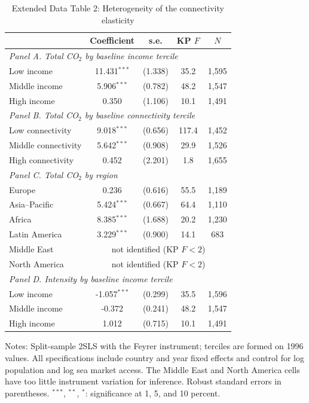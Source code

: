 \documentclass[12pt]{article}
\begin{document}
\begin{table}[htbp]
\centering
\begin{threeparttable}
\caption{Extended Data Table 2: Heterogeneity of the connectivity elasticity}
\label{tab:hetero}
\footnotesize
\begin{tabular}{lcccc}
\toprule
 & Coefficient & s.e. & KP $F$ & $N$ \\
\midrule
\multicolumn{5}{l}{\textit{Panel A. Total CO$_2$ by baseline income tercile}} \\
  Low income & 11.431$^{***}$ & (1.338) & 35.2 & 1,595 \\
  Middle income & 5.906$^{***}$ & (0.782) & 48.2 & 1,547 \\
  High income & 0.350 & (1.106) & 10.1 & 1,491 \\
\midrule
\multicolumn{5}{l}{\textit{Panel B. Total CO$_2$ by baseline connectivity tercile}} \\
  Low connectivity & 9.018$^{***}$ & (0.656) & 117.4 & 1,452 \\
  Middle connectivity & 5.642$^{***}$ & (0.908) & 29.9 & 1,526 \\
  High connectivity & 0.452 & (2.201) & 1.8 & 1,655 \\
\midrule
\multicolumn{5}{l}{\textit{Panel C. Total CO$_2$ by region}} \\
  Europe & 0.236 & (0.616) & 55.5 & 1,189 \\
  Asia--Pacific & 5.424$^{***}$ & (0.667) & 64.4 & 1,110 \\
  Africa & 8.385$^{***}$ & (1.688) & 20.2 & 1,230 \\
  Latin America & 3.229$^{***}$ & (0.900) & 14.1 & 683 \\
  Middle East & \multicolumn{4}{c}{not identified (KP $F<2$)} \\
  North America & \multicolumn{4}{c}{not identified (KP $F<2$)} \\
\midrule
\multicolumn{5}{l}{\textit{Panel D. Intensity by baseline income tercile}} \\
  Low income & -1.057$^{***}$ & (0.299) & 35.5 & 1,596 \\
  Middle income & -0.372 & (0.241) & 48.2 & 1,547 \\
  High income & 1.012 & (0.715) & 10.1 & 1,491 \\
\bottomrule
\end{tabular}
\begin{tablenotes}[flushleft]
\footnotesize
\item Notes: Split-sample 2SLS with the Feyrer instrument; terciles are formed on 1996 values. All specifications include country and year fixed effects and control for log population and log sea market access. The Middle East and North America cells have too little instrument variation for inference. Robust standard errors in parentheses. $^{***}$, $^{**}$, $^{*}$: significance at 1, 5, and 10 percent.
\end{tablenotes}
\end{threeparttable}
\end{table}
\end{document}
